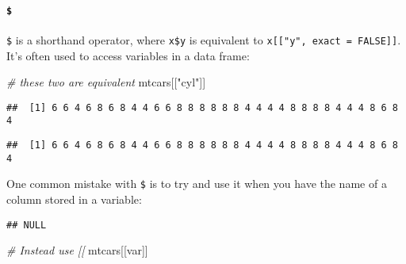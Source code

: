 \documentclass[
]{book}
\newenvironment{Shaded}{\begin{snugshade}}{\end{snugshade}}
\newcommand{\CommentTok}[1]{\textcolor[rgb]{0.56,0.35,0.01}{\textit{#1}}}
\newcommand{\NormalTok}[1]{#1}
\newcommand{\OperatorTok}[1]{\textcolor[rgb]{0.81,0.36,0.00}{\textbf{#1}}}
\newcommand{\StringTok}[1]{\textcolor[rgb]{0.31,0.60,0.02}{#1}}
\begin{document}
\hypertarget{section-1}{%
\paragraph{\texorpdfstring{\texttt{\$}}{\$}}\label{section-1}}

\texttt{\$} is a shorthand operator, where \texttt{x\$y} is equivalent to \texttt{x{[}{[}"y",\ exact\ =\ FALSE{]}{]}}. It's often used to access variables in a data frame:

\begin{Shaded}
\begin{Highlighting}[]
\CommentTok{\# these two are equivalent}
\NormalTok{mtcars[[}\StringTok{"cyl"}\NormalTok{]]}
\end{Highlighting}
\end{Shaded}

\begin{verbatim}
##  [1] 6 6 4 6 8 6 8 4 4 6 6 8 8 8 8 8 8 4 4 4 4 8 8 8 8 4 4 4 8 6 8 4
\end{verbatim}

\begin{Shaded}
\end{Shaded}

\begin{verbatim}
##  [1] 6 6 4 6 8 6 8 4 4 6 6 8 8 8 8 8 8 4 4 4 4 8 8 8 8 4 4 4 8 6 8 4
\end{verbatim}

One common mistake with \texttt{\$} is to try and use it when you have the name of a column stored in a variable:

\begin{Shaded}
\end{Shaded}

\begin{verbatim}
## NULL
\end{verbatim}

\begin{Shaded}
\begin{Highlighting}[]
\CommentTok{\# Instead use [[}
\NormalTok{mtcars[[var]]}
\end{Highlighting}
\end{Shaded}
\end{document}
